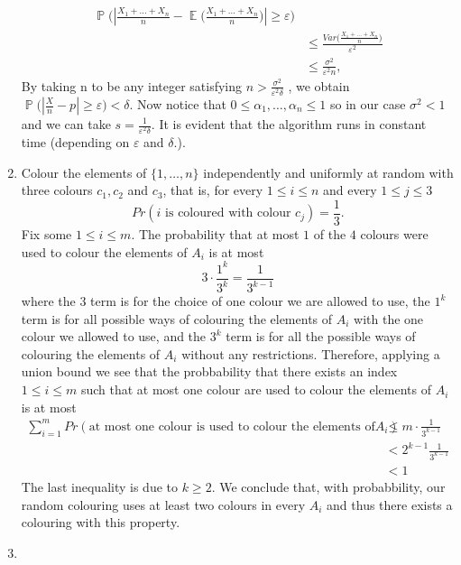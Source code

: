 \documentclass[a4paper, 11pt, oneside]{article}
\newcommand\abs[1]{\left|#1\right|}
\DeclareMathOperator{\EX}{\mathbb{E}}
\DeclareMathOperator{\PX}{\mathbb{P}}
\begin{document}
\begin{enumerate}
\begin{align*}
\PX\Big(\abs{\frac{X_1 + \ldots + X_n}{n} - \EX\Big(\frac{X_1 + \ldots + X_n}{n}\Big)} \geq \varepsilon \Big) \\&\leq
\frac{Var\Big(\frac{X_1 + \ldots + X_n}{n}\Big)}{\varepsilon^2} \\&\leq \frac{\sigma^2}{\varepsilon^2n},
 \end{align*}
 By taking n to be any integer satisfying
  $n >  \frac{\sigma^2}{\varepsilon^2\delta}$ , we obtain $\PX\Big(\abs{\frac{X}{n} - p} \geq \varepsilon \Big) < \delta$.
  Now notice that $0 \leq \alpha_1, \ldots, \alpha_n \leq 1$ so in our case $\sigma^2 < 1$ and we can take $s =\frac{1}{\varepsilon^2\delta} $.
  It is evident that the algorithm runs in constant time (depending on $\varepsilon$ and $\delta.$).
  
\item Colour the elements of $\{1,\ldots,n\}$ independently and uniformly at random with three colours $c_1,c_2$ and $c_3$, 
that is, for every $1 \leq i \leq n$ and every $1 \leq j \leq 3$
\begin{equation*}
Pr(i\text{ is coloured with colour }c_j) = \frac{1}{3}.
 \end{equation*}
Fix some $1 \leq i \leq m$. The probability that at most $1$ of the $4$ colours were used to colour the elements of $A_i$ is at most
\begin{equation*}
3 \cdot \frac{1^k}{3^k} = \frac{1}{3^{k-1}}
 \end{equation*}
 where the $3$ term is for the choice of one colour we are allowed to use, the $1^k$ term is for all possible ways of colouring the elements of $A_i$ with the one colour we allowed to use, and the $3^k$ term is for all the possible ways of colouring the elements of $A_i$ without any restrictions.
 Therefore, applying a union bound we see that the probbability that there exists an index $1 \leq i \leq m$ such that at most one colour are used to colour the elements of $A_i$ is at most
 \begin{align*}
\sum^m_{i=1}Pr(\text{at most one colour is used to colour the elements of} A_i) &\leq m \cdot\frac{1}{3^{k-1}} 
\\&< 2^{k-1} \frac{1}{3^{k-1}}  \\&< 1
 \end{align*}
The last inequality is due to $k \geq 2$. We conclude that, with probabbility, our random colouring uses at least two colours in every $A_i$ and thus there exists a colouring with this property.
\item
 \begin{enumerate}

\end{enumerate}
\end{enumerate}
\end{document}
